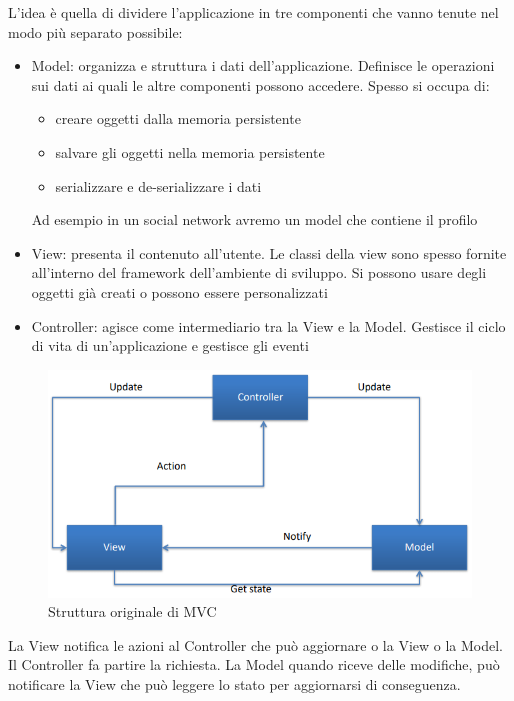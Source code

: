 L'idea è quella di dividere l'applicazione in tre componenti che vanno tenute nel modo più separato possibile:
\begin{itemize}
    \item Model: organizza e struttura i dati dell'applicazione. Definisce le operazioni sui dati ai quali le altre componenti possono accedere. Spesso si occupa di:
    \begin{itemize}
        \item creare oggetti dalla memoria persistente
        \item salvare gli oggetti nella memoria persistente
        \item serializzare e de-serializzare i dati
    \end{itemize}
    Ad esempio in un social network avremo un model che contiene il profilo
    \item View: presenta il contenuto all'utente. Le classi della view sono spesso fornite all'interno del framework dell'ambiente di sviluppo. Si possono usare degli oggetti già creati o possono essere personalizzati
    \item Controller: agisce come intermediario tra la View e la Model. Gestisce il ciclo di vita di un'applicazione e gestisce gli eventi
\end{itemize}

\begin{figure}[!ht]
    \centering
    \includegraphics[width=.8\textwidth]{images/Mobile computing/6. Progettazione/struttura originale MVC.PNG}
    \caption{Struttura originale di MVC}
    \label{fig:MVC}
\end{figure}
La View notifica le azioni al Controller che può aggiornare o la View o la Model. Il Controller fa partire la richiesta. La Model quando riceve delle modifiche, può notificare la View che può leggere lo stato per aggiornarsi di conseguenza. 

